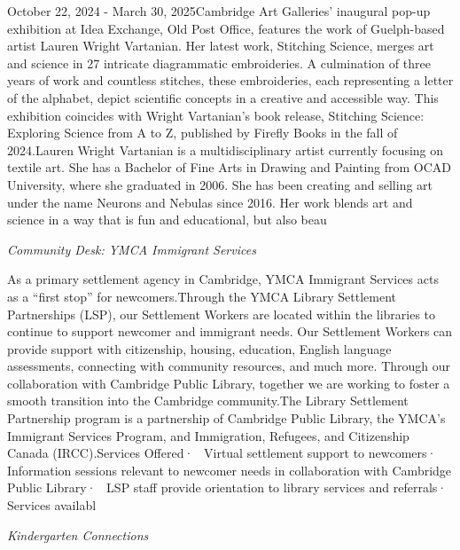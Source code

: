 \documentclass[letterpaper, 10pt]{article}
\newcommand{\subtitle}[1]{\textit{\large #1}\vspace{0.5em}}
\newcommand{\articlecontent}[1]{\small #1\vspace{1em}}
\begin{document}
\begin{multicols}{2}
{October 22, 2024 - March 30, 2025Cambridge Art Galleries' inaugural pop-up exhibition at Idea Exchange, Old Post Office, features the work of Guelph-based artist Lauren Wright Vartanian. Her latest work, Stitching Science, merges art and science in 27 intricate diagrammatic embroideries. A culmination of three years of work and countless stitches, these embroideries, each representing a letter of the alphabet, depict scientific concepts in a creative and accessible way. This exhibition coincides with Wright Vartanian’s book release, Stitching Science: Exploring Science from A to Z, published by Firefly Books in the fall of 2024.Lauren Wright Vartanian is a multidisciplinary artist currently focusing on textile art. She has a Bachelor of Fine Arts in Drawing and Painting from OCAD University, where she graduated in 2006. She has been creating and selling art under the name Neurons and Nebulas since 2016. Her work blends art and science in a way that is fun and educational, but also beau
}
\vspace{10px}

\subtitle{Community Desk: YMCA Immigrant Services}

\articlecontent{

\qrcode[height=1.5cm]{https://ideaexchange.libnet.info/event/12494381}
\vspace{10px}

As a primary settlement agency in Cambridge, YMCA Immigrant Services acts as a “first stop” for newcomers.Through the YMCA Library Settlement Partnerships (LSP), our Settlement Workers are located within the libraries to continue to support newcomer and immigrant needs. Our Settlement Workers can provide support with citizenship, housing, education, English language assessments, connecting with community resources, and much more. Through our collaboration with Cambridge Public Library, together we are working to foster a smooth transition into the Cambridge community.The Library Settlement Partnership program is a partnership of Cambridge Public Library, the YMCA’s Immigrant Services Program, and Immigration, Refugees, and Citizenship Canada (IRCC).Services Offered·  Virtual settlement support to newcomers·  Information sessions relevant to newcomer needs in collaboration with Cambridge Public Library·  LSP staff provide orientation to library services and referrals·  Services availabl
}
\vspace{10px}

\subtitle{Kindergarten Connections}

\articlecontent{

}
\end{multicols}
\end{document}
